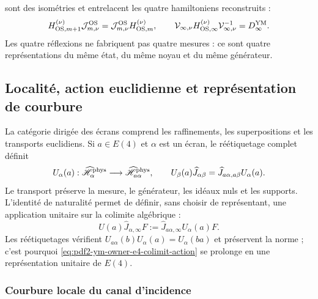 sont des isométries et entrelacent les quatre hamiltoniens reconstruits :
\begin{equation}\label{eq:pdf2-ym-owner-common-os-hamiltonian}
 H_{{\rm OS},m+1}^{(\nu)}\mathcal J_{m,\nu}^{\rm OS}
 =\mathcal J_{m,\nu}^{\rm OS}H_{{\rm OS},m}^{(\nu)},
 \qquad
 \mathcal V_{\infty,\nu}H_{{\rm OS},\infty}^{(\nu)}
 \mathcal V_{\infty,\nu}^{-1}=D_\infty^{\rm YM}.
\end{equation}
Les quatre réflexions ne fabriquent pas quatre mesures : ce sont quatre représentations du même état, du même noyau et du même générateur.

\subsection{Localité, action euclidienne et représentation de courbure}

La catégorie dirigée des écrans comprend les raffinements, les superpositions et les transports
euclidiens. Si $a\in E(4)$ et $\alpha$ est un écran, le réétiquetage complet définit
\begin{equation}\label{eq:pdf2-ym-owner-e4-finite-transport}
 U_\alpha(a):\widehat{\mathscr H}_\alpha^{\rm phys}
 \longrightarrow\widehat{\mathscr H}_{a\alpha}^{\rm phys},
 \qquad
 U_\beta(a)\widehat J_{\alpha\beta}
 =\widehat J_{a\alpha,a\beta}U_\alpha(a).
\end{equation}
Le transport préserve la mesure, le générateur, les idéaux nuls et les supports. L'identité de naturalité permet de définir, sans choisir de représentant, une application unitaire sur la colimite algébrique :
\begin{equation}\label{eq:pdf2-ym-owner-e4-colimit-action}
 U(a)\widehat J_{\alpha,\infty}F
 :=\widehat J_{a\alpha,\infty}U_\alpha(a)F.
\end{equation}
Les réétiquetages vérifient $U_{a\alpha}(b)U_\alpha(a)=U_\alpha(ba)$ et préservent
la norme ; c’est pourquoi \eqref{eq:pdf2-ym-owner-e4-colimit-action} se prolonge en une
représentation unitaire de $E(4)$.

\subsubsection{Courbure locale du canal d’incidence}

